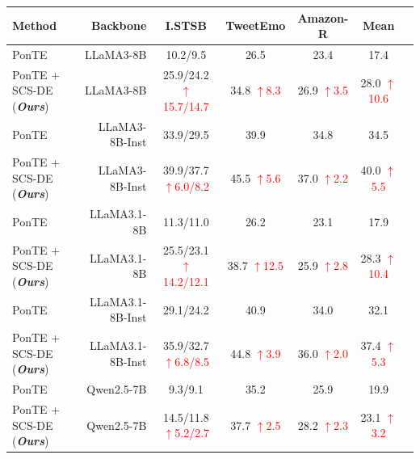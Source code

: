 \documentclass[11pt]{article}
\newcommand{\up}[1]{\textcolor{red}{{$\uparrow$#1}}}
\newcommand{\down}[1]{\textcolor{red}{{$\downarrow$#1}}}
\begin{document}
\begin{table}[t] \scriptsize \setlength{\tabcolsep}{12pt}
\centering
\begin{tabular}{lrccccc}
\toprule
\textbf{Method} & \textbf{Backbone} & \textbf{I.STSB} & \textbf{TweetEmo} & \textbf{Amazon-R} & \textbf{Mean}\\
\midrule
PonTE & LLaMA3-8B &10.2/9.5 &26.5 &23.4  & 17.4\\
PonTE + SCS-DE (\textbf{\textit{Ours}})& LLaMA3-8B & \cellcolor{tabcolor3} 25.9/24.2 \up{15.7/14.7} & \cellcolor{tabcolor3} 34.8 \up{8.3} &26.9 \up{3.5} \cellcolor{tabcolor3} &  \cellcolor{tabcolor3} 28.0 \up{10.6}\\
\midrule
PonTE & LLaMA3-8B-Inst &33.9/29.5 &39.9 &34.8 &34.5 \\
PonTE + SCS-DE (\textbf{\textit{Ours}}) & LLaMA3-8B-Inst & \cellcolor{tabcolor3} 39.9/37.7 \up{6.0/8.2} & \cellcolor{tabcolor3} 45.5 \up{5.6} & \cellcolor{tabcolor3} 37.0 \up{2.2} & \cellcolor{tabcolor3} 40.0 \up{5.5} \\
\midrule
PonTE & LLaMA3.1-8B &11.3/11.0 &26.2 &23.1 &17.9 \\
PonTE + SCS-DE (\textbf{\textit{Ours}}) & LLaMA3.1-8B & \cellcolor{tabcolor3} 25.5/23.1 \up{14.2/12.1} & \cellcolor{tabcolor3} 38.7 \up{12.5} &25.9 \up{2.8} \cellcolor{tabcolor3} & \cellcolor{tabcolor3} 28.3 \up{10.4} \\
\midrule
PonTE & LLaMA3.1-8B-Inst &29.1/24.2 &40.9  &34.0 &32.1 \\
PonTE + SCS-DE (\textbf{\textit{Ours}}) & LLaMA3.1-8B-Inst & \cellcolor{tabcolor3} 35.9/32.7 \up{6.8/8.5} & \cellcolor{tabcolor3} 44.8 \up{3.9} &36.0 \up{2.0} \cellcolor{tabcolor3} & \cellcolor{tabcolor3} 37.4 \up{5.3}\\
\midrule
PonTE & Qwen2.5-7B & 9.3/9.1 & 35.2 & 25.9  &19.9 \\ 
PonTE + SCS-DE (\textbf{\textit{Ours}}) & Qwen2.5-7B & \cellcolor{tabcolor3} 14.5/11.8 \up{5.2/2.7} & \cellcolor{tabcolor3} 37.7 \up{2.5} & \cellcolor{tabcolor3} 28.2 \up{2.3} & \cellcolor{tabcolor3} 23.1 \up{3.2}\\

\end{tabular}
\end{table}
\end{document}
